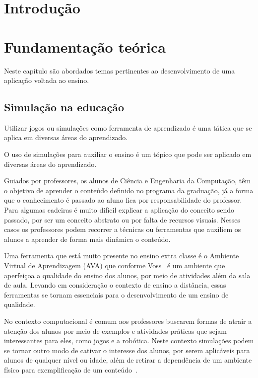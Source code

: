 \documentclass[tcc,capa]{texufpel}
\begin{document}
\tableofcontents

\chapter{Introdução}



\chapter{Fundamentação teórica}

Neste capítulo são abordados temas pertinentes ao desenvolvimento de uma aplicação voltada ao ensino. 

\section{Simulação na educação}

Utilizar jogos ou simulações como ferramenta de aprendizado é uma tática que se aplica em diversas áreas do aprendizado. 

O uso de simulações para auxiliar o ensino é um tópico que pode ser aplicado em diversas áreas do aprendizado. 

Guiados por professores, os alunos de Ciência e Engenharia da Computação, têm o objetivo de aprender o conteúdo definido no programa da graduação, já a forma que o conhecimento é passado ao aluno fica por responsabilidade do professor. Para algumas cadeiras é muito difícil explicar a aplicação do conceito sendo passado, por ser um conceito abstrato ou por falta de recursos visuais. Nesses casos os professores podem recorrer a técnicas ou ferramentas que auxiliem os alunos a aprender de forma mais dinâmica o conteúdo.

Uma ferramenta que está muito presente no ensino extra classe é o Ambiente Virtual de Aprendizagem (AVA) que conforme Voss~\cite{Voss_Nunes_Herpich_Medina_2015} é um ambiente que aperfeiçoa a qualidade do ensino dos alunos, por meio de atividades além da sala de aula. Levando em consideração o contexto de ensino a distância, essas ferramentas se tornam essenciais para o desenvolvimento de um ensino de qualidade. 

No contexto computacional é comum aos professores buscarem formas de atrair a atenção dos alunos por meio de exemplos e atividades práticas que sejam interessantes para eles, como jogos e a robótica. Neste contexto simulações podem se tornar outro modo de cativar o interesse dos alunos, por serem aplicáveis para alunos de qualquer nível ou idade, além de retirar a dependência de um ambiente físico para exemplificação de um conteúdo~\cite{kincaid2003simulation}.
\end{document}
